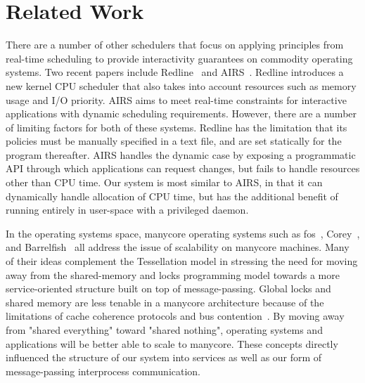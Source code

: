 \documentclass[letterpaper,twocolumn,11pt]{article}
\begin{document}
\section{Related Work}

There are a number of other schedulers that focus on applying principles from real-time scheduling to provide interactivity guarantees on commodity operating systems. Two recent papers include Redline~\cite{DBLP:conf/osdi/YangLBKM08} and AIRS~\cite{DBLP:conf/osdi/YangLBKM08}. Redline introduces a new kernel CPU scheduler that also takes into account resources such as memory usage and I/O priority. AIRS aims to meet real-time constraints for interactive applications with dynamic scheduling requirements. However, there are a number of limiting factors for both of these systems. Redline has the limitation that its policies must be manually specified in a text file, and are set statically for the program thereafter. AIRS handles the dynamic case by exposing a programmatic API through which applications can request changes, but fails to handle resources other than CPU time. Our system is most similar to AIRS, in that it can dynamically handle allocation of CPU time, but has the additional benefit of running entirely in user-space with a privileged daemon.


In the operating systems space, manycore operating systems such as fos~\cite{Wentzlaff:2009:FOS:1531793.1531805}, Corey~\cite{Boyd-Wickizer:2008:COS:1855741.1855745}, and Barrelfish~\cite{Schüpbach08embracingdiversity} all address the issue of scalability on manycore machines. Many of their ideas complement the Tessellation model in stressing the need for moving away from the shared-memory and locks programming model towards a more service-oriented structure built on top of message-passing. Global locks and shared memory are less tenable in a manycore architecture because of the limitations of cache coherence protocols and bus contention~\cite{??????????XXXXXXXXX}. By moving away from "shared everything" toward "shared nothing", operating systems and applications will be better able to scale to manycore. These concepts directly influenced the structure of our system into services as well as our form of message-passing interprocess communication.
\end{document}
